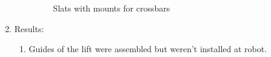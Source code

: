 \begin{enumerate}
\begin{enumerate}
\begin{figure}[H]
\begin{minipage}[h]{0.47\linewidth}
      	\end{minipage}
      	\caption{Slats with mounts for crossbars}
      \end{figure}
      
    \end{enumerate}
    
	\item Results: 
	\begin{enumerate}
	  \item Guides of the lift were assembled but weren't installed at robot.


\end{enumerate}
\end{enumerate}
